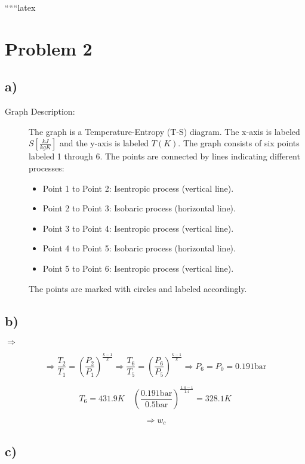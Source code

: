 
``````latex


\section*{Problem 2}

\subsection*{a)}

\begin{description}
    \item[Graph Description:] The graph is a Temperature-Entropy (T-S) diagram. The x-axis is labeled $S \left[ \frac{kJ}{kgK} \right]$ and the y-axis is labeled $T (K)$. The graph consists of six points labeled 1 through 6. The points are connected by lines indicating different processes:
    \begin{itemize}
        \item Point 1 to Point 2: Isentropic process (vertical line).
        \item Point 2 to Point 3: Isobaric process (horizontal line).
        \item Point 3 to Point 4: Isentropic process (vertical line).
        \item Point 4 to Point 5: Isobaric process (horizontal line).
        \item Point 5 to Point 6: Isentropic process (vertical line).
    \end{itemize}
    The points are marked with circles and labeled accordingly.
\end{description}

\subsection*{b)}

 $\Rightarrow$ 

\[
\Rightarrow \frac{T_2}{T_1} = \left( \frac{P_2}{P_1} \right)^{\frac{k-1}{k}} \Rightarrow \frac{T_6}{T_5} = \left( \frac{P_6}{P_5} \right)^{\frac{k-1}{k}} \Rightarrow P_6 = P_0 = 0.191 \text{bar}
\]

\[
T_6 = 431.9 K \quad \left( \frac{0.191 \text{bar}}{0.5 \text{bar}} \right)^{\frac{1.4-1}{1.4}} = 328.1 K
\]

\[
\Rightarrow w_c
\]

\subsection*{c)}

